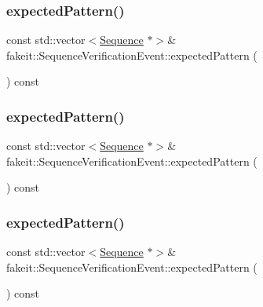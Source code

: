 \subsubsection{\texorpdfstring{expectedPattern()}{expectedPattern()}\hspace{0.1cm}{\footnotesize\ttfamily [2/9]}}
{\footnotesize\ttfamily const std\+::vector$<$\mbox{\hyperlink{classfakeit_1_1Sequence}{Sequence}} $\ast$$>$\& fakeit\+::\+Sequence\+Verification\+Event\+::expected\+Pattern (\begin{DoxyParamCaption}{ }\end{DoxyParamCaption}) const\hspace{0.3cm}{\ttfamily [inline]}}

\mbox{\label{structfakeit_1_1SequenceVerificationEvent_a2d3fb35082acdadfe2be2a4d69c94189}} 
\subsubsection{\texorpdfstring{expectedPattern()}{expectedPattern()}\hspace{0.1cm}{\footnotesize\ttfamily [3/9]}}
{\footnotesize\ttfamily const std\+::vector$<$\mbox{\hyperlink{classfakeit_1_1Sequence}{Sequence}} $\ast$$>$\& fakeit\+::\+Sequence\+Verification\+Event\+::expected\+Pattern (\begin{DoxyParamCaption}{ }\end{DoxyParamCaption}) const\hspace{0.3cm}{\ttfamily [inline]}}

\mbox{\label{structfakeit_1_1SequenceVerificationEvent_a2d3fb35082acdadfe2be2a4d69c94189}} 
\subsubsection{\texorpdfstring{expectedPattern()}{expectedPattern()}\hspace{0.1cm}{\footnotesize\ttfamily [4/9]}}
{\footnotesize\ttfamily const std\+::vector$<$\mbox{\hyperlink{classfakeit_1_1Sequence}{Sequence}} $\ast$$>$\& fakeit\+::\+Sequence\+Verification\+Event\+::expected\+Pattern (\begin{DoxyParamCaption}{ }\end{DoxyParamCaption}) const\hspace{0.3cm}{\ttfamily [inline]}}

